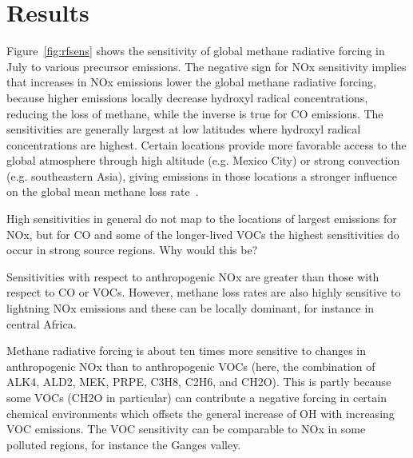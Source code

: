 \section{Results}

Figure~\ref{fig:rfsens} shows the sensitivity of global methane radiative forcing in July to various precursor emissions. The negative sign for NOx sensitivity implies that increases in NOx emissions lower the global methane radiative forcing, because higher emissions locally decrease hydroxyl radical concentrations, reducing the loss of methane, while the inverse is true for CO emissions. The sensitivities are generally largest at low latitudes where hydroxyl radical concentrations are highest. Certain locations provide more favorable access to the global atmosphere through high altitude (e.g. Mexico City) or strong convection (e.g. southeastern Asia), giving emissions in those locations a stronger influence on the global mean methane loss rate~\citep{ref:bowman2012}.

High sensitivities in general do not map to the locations of largest emissions for NOx, but for CO and some of the longer-lived VOCs the highest sensitivities do occur in strong source regions. Why would this be?

Sensitivities with respect to anthropogenic NOx are greater than those with respect to CO or VOCs. However, methane loss rates are also highly sensitive to lightning NOx emissions and these can be locally dominant, for instance in central Africa.

Methane radiative forcing is about ten times more sensitive to changes in anthropogenic NOx than to anthropogenic VOCs (here, the combination of ALK4, ALD2, MEK, PRPE, C3H8, C2H6, and CH2O). This is partly because some VOCs (CH2O in particular) can contribute a negative forcing in certain chemical environments which offsets the general increase of OH with increasing VOC emissions. The VOC sensitivity can be comparable to NOx in some polluted regions, for instance the Ganges valley.

